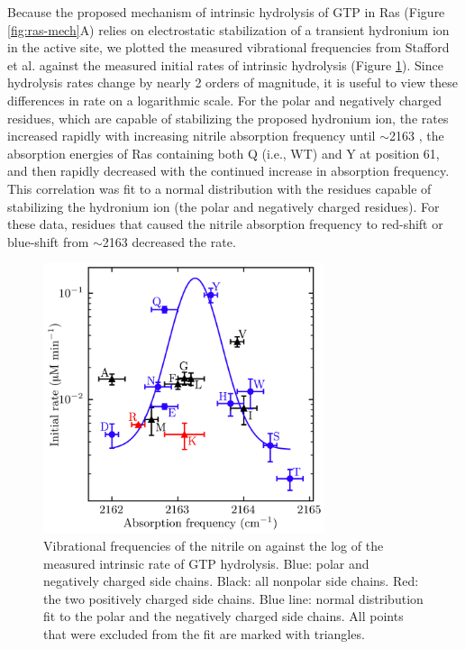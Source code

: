 Because the proposed mechanism of intrinsic hydrolysis of GTP in Ras (Figure \ref{fig:ras-mech}A) relies on electrostatic stabilization of a transient hydronium ion in the active site, we plotted the measured vibrational frequencies from Stafford et al.\cite{Stafford2012} against the measured initial rates of intrinsic hydrolysis (Figure \ref{fig:ras-stark_vs_rate}). 
Since hydrolysis rates change by nearly 2 orders of magnitude, it is useful to view these differences in rate on a logarithmic scale. 
For the polar and negatively charged residues, which are capable of stabilizing the proposed hydronium ion, the rates increased rapidly with increasing nitrile absorption frequency until $\sim$2163 \si{\wn}, the absorption energies of Ras containing both Q (i.e., WT) and Y at position 61, and then rapidly decreased with the continued increase in absorption frequency. 
This correlation was fit to a normal distribution with the residues capable of stabilizing the hydronium ion (the polar and negatively charged residues). 
For these data, residues that caused the nitrile absorption frequency to red-shift or blue-shift from $\sim$2163 \si{\wn} decreased the rate.

\begin{figure}
    \center
    \includegraphics[width=3.25in]{figures-ras/Figure4.png}
    \caption{Vibrational frequencies of the nitrile on \RalBSCN{} against the log of the measured intrinsic rate of GTP hydrolysis. Blue: polar and negatively charged side chains. Black: all nonpolar side chains. Red: the two positively charged side chains. Blue line: normal distribution fit to the polar and the negatively charged side chains. All points that were excluded from the fit are marked with triangles.}
    \label{fig:ras-stark_vs_rate}
\end{figure}

